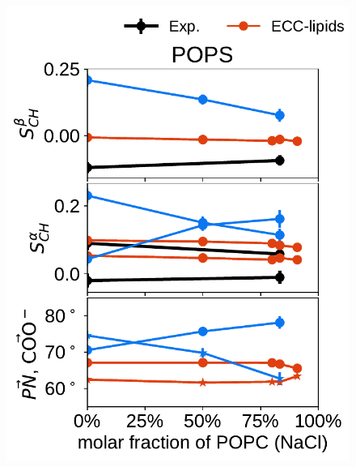 \documentclass[journal=jpcbfk,manuscript=article]{achemso}
\newlength{\figheightsmall}
\newlength{\figheight}
\begin{document}
\begin{figure}[!tbp] 
  \centering 
  \includegraphics[height=\figheightsmall]{../Fig/order_parameters_changes_A-B_PC-PS_mix_POPS_nacl.pdf} 

\end{figure}
\end{document}
